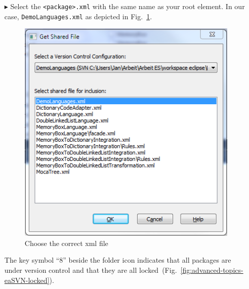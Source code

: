 \begin{enumerate}
 \item[$\blacktriangleright$] Select the \texttt{<package>.xml} with the same name as your root element. 
 In our case, \texttt{DemoLanguages.xml} as depicted in Fig.~\ref{fig:advanced-topics-eaSVN-selectxml}.
\begin{figure}[htbp]
\begin{center}
\includegraphics[height=0.5\textheight]{pics/advancedTopics/eaSVN/DemoLanguages/005.png}
	\caption{Choose the correct xml file}
  	\label{fig:advanced-topics-eaSVN-selectxml}
\end{center}
\end{figure}
The key symbol ``8'' beside the folder icon indicates that all packages are under version control and that they are all locked~(Fig.~\ref{fig:advanced-topics-eaSVN-locked}).


\end{enumerate}
